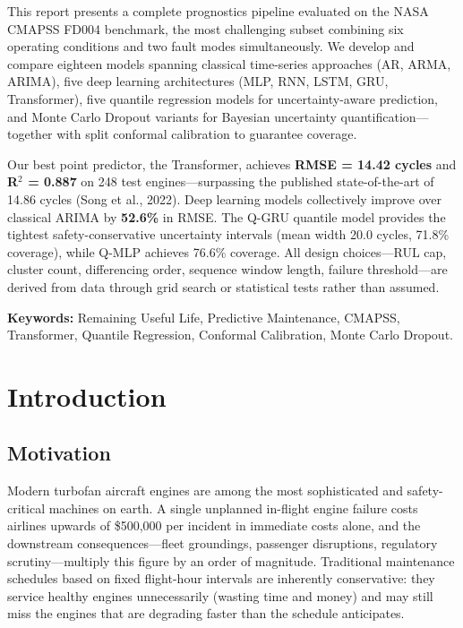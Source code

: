 \documentclass[12pt,a4paper]{report}
\begin{document}
This report presents a complete prognostics pipeline evaluated on the NASA CMAPSS FD004 benchmark, the most challenging subset combining six operating conditions and two fault modes simultaneously. We develop and compare eighteen models spanning classical time-series approaches (AR, ARMA, ARIMA), five deep learning architectures (MLP, RNN, LSTM, GRU, Transformer), five quantile regression models for uncertainty-aware prediction, and Monte Carlo Dropout variants for Bayesian uncertainty quantification—together with split conformal calibration to guarantee coverage.

Our best point predictor, the Transformer, achieves \textbf{RMSE = 14.42 cycles} and \textbf{R$^2$ = 0.887} on 248 test engines—surpassing the published state-of-the-art of 14.86 cycles (Song et al., 2022). Deep learning models collectively improve over classical ARIMA by \textbf{52.6\%} in RMSE. The Q-GRU quantile model provides the tightest safety-conservative uncertainty intervals (mean width 20.0 cycles, 71.8\% coverage), while Q-MLP achieves 76.6\% coverage. All design choices—RUL cap, cluster count, differencing order, sequence window length, failure threshold—are derived from data through grid search or statistical tests rather than assumed.

\textbf{Keywords:} Remaining Useful Life, Predictive Maintenance, CMAPSS, Transformer, Quantile Regression, Conformal Calibration, Monte Carlo Dropout.

\tableofcontents
\listoffigures
\listoftables

\chapter{Introduction}

\section{Motivation}

Modern turbofan aircraft engines are among the most sophisticated and safety-critical machines on earth. A single unplanned in-flight engine failure costs airlines upwards of \$500{,}000 per incident in immediate costs alone, and the downstream consequences—fleet groundings, passenger disruptions, regulatory scrutiny—multiply this figure by an order of magnitude. Traditional maintenance schedules based on fixed flight-hour intervals are inherently conservative: they service healthy engines unnecessarily (wasting time and money) and may still miss the engines that are degrading faster than the schedule anticipates.
\end{document}
